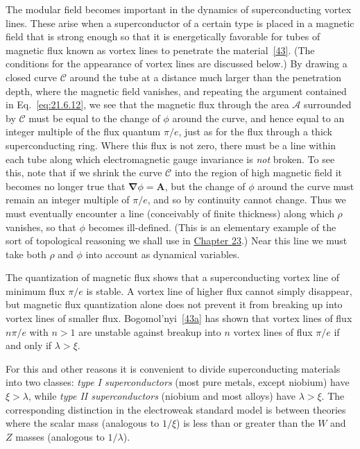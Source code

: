 The modular field becomes important in the dynamics of superconducting vortex lines. These arise when a superconductor of a certain type is placed in a magnetic field that is strong enough so that it is energetically favorable for tubes of magnetic flux known as vortex lines to penetrate the material~\hyperref[ch21-ref-43]{[43]}. (The conditions for the appearance of vortex lines are discussed below.) By drawing a closed curve $\mathcal C$ around the tube at a distance much larger than the penetration depth, where the magnetic field vanishes, and repeating the argument contained in Eq.~\eqref{eq:21.6.12}, we see that the magnetic flux through the area $\mathcal A$ surrounded by $\mathcal C$ must be equal to the change of $\phi$ around the curve, and hence equal to an integer multiple of the flux quantum $\pi/e$, just as for the flux through a thick superconducting ring. Where this flux is not zero, there must be a line within each tube along which electromagnetic gauge invariance is \emph{not} broken. To see this, note that if we shrink the curve $\mathcal C$ into the region of high magnetic field it becomes no longer true that $\boldsymbol\nabla\phi=\mathbf A$, but the change of $\phi$ around the curve must remain an integer multiple of $\pi/e$, and so by continuity cannot change. Thus we must eventually encounter a line (conceivably of finite thickness) along which $\rho$ vanishes, so that $\phi$ becomes ill-defined. (This is an elementary example of the sort of topological reasoning we shall use in \hyperref[chap:23]{Chapter 23}.) Near this line we must take both $\rho$ and $\phi$ into account as dynamical variables.

The quantization of magnetic flux shows that a superconducting vortex line of minimum flux $\pi/e$ is stable. A vortex line of higher flux cannot simply disappear, but magnetic flux quantization alone does not prevent it from breaking up into vortex lines of smaller flux. Bogomol'nyi~\hyperref[ch21-ref-43a]{[43a]} has shown that vortex lines of flux $n\pi/e$ with $n>1$ are unstable against breakup into $n$ vortex lines of flux $\pi/e$ if and only if $\lambda>\xi$.

For this and other reasons it is convenient to divide superconducting materials into two classes: \emph{type I superconductors} (most pure metals, except niobium) have $\xi>\lambda$, while \emph{type II superconductors} (niobium and most alloys) have $\lambda>\xi$. The corresponding distinction in the electroweak standard model is between theories where the scalar mass (analogous to $1/\xi$) is less than or greater than the $W$ and $Z$ masses (analogous to $1/\lambda$).

